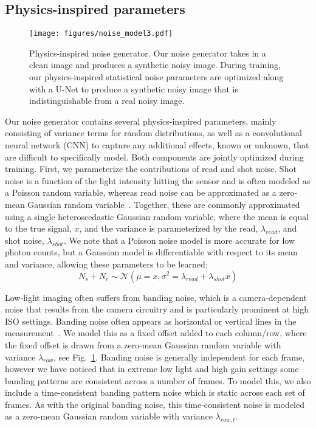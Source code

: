 \documentclass[final]{cvpr}
\begin{document}
\subsection{Physics-inspired parameters}

\begin{figure}[thb]
\centering
\texttt{[image: figures/noise\_model3.pdf]}
   \caption{Physics-inspired noise generator. Our noise generator takes in a clean image and produces a synthetic noisy image. During training, our physics-inspired statistical noise parameters are optimized along with a U-Net to produce a synthetic noisy image that is indistinguishable from a real noisy image.}
\label{fig:noise_model}
\vspace{-3mm}
\end{figure}

Our noise generator contains several physics-inspired parameters, mainly consisting of variance terms for random distributions, as well as a convolutional neural network (CNN) to capture any additional effects, known or unknown, that are difficult to specifically model. Both components are jointly optimized during training. First, we parameterize the contributions of read and shot noise. Shot noise is a function of the light intensity hitting the sensor and is often modeled as a Poisson random variable, whereas read noise can be approximated as a zero-mean Gaussian random variable~\cite{foi2008practical, foi2009clipped}. Together, these are commonly approximated using a single heteroscedastic Gaussian random variable, where the mean is equal to the true signal, $x$, and the variance is parameterized by the read, $\lambda_{read}$, and shot noise, $\lambda_{shot}$. We note that a Poisson noise model is more accurate for low photon counts, but a Gaussian model is differentiable with respect to its mean and variance, allowing these parameters to be learned:
\begin{equation}
   N_{s} + N_{r} \sim \mathcal{N} (\mu = x, \sigma^2 = \lambda_{read} + \lambda_{shot}x)
\end{equation}

Low-light imaging often suffers from banding noise, which is a camera-dependent noise that results from the camera circuitry and is particularly prominent at high ISO settings. Banding noise often appears as horizontal or vertical lines in the measurement~\cite{konnik2014high, boukhayma2018low}. We model this as a fixed offset added to each column/row, where the fixed offset is drawn from a zero-mean Gaussian random variable with variance $\lambda_{row}$, see Fig.~\ref{fig:noise_model}. 
Banding noise is generally independent for each frame, however we have noticed that in extreme low light and high gain settings some banding patterns are consistent across a number of frames. To model this, we also include a time-consistent banding pattern noise which is static across each set of frames. As with the original banding noise, this time-consistent noise is modeled as a zero-mean Gaussian random variable with variance $\lambda_{row, t}$. 
\end{document}
